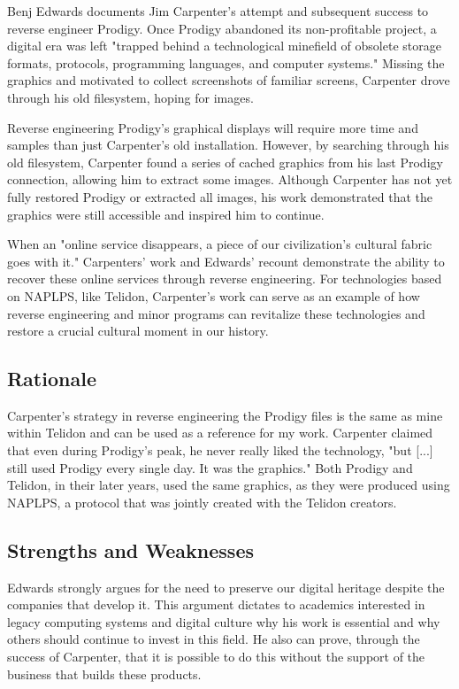 \documentclass[sigconf]{acmart}
\begin{document}
Benj Edwards documents Jim Carpenter's attempt and subsequent success to reverse engineer Prodigy. Once Prodigy abandoned its non-profitable project, a digital era was left "trapped behind a technological minefield of obsolete storage formats, protocols, programming languages, and computer systems." Missing the graphics and motivated to collect screenshots of familiar screens, Carpenter drove through his old filesystem, hoping for images.

Reverse engineering Prodigy's graphical displays will require more time and samples than just Carpenter's old installation. However, by searching through his old filesystem, Carpenter found a series of cached graphics from his last Prodigy connection, allowing him to extract some images. Although Carpenter has not yet fully restored Prodigy or extracted all images, his work demonstrated that the graphics were still accessible and inspired him to continue.

When an "online service disappears, a piece of our civilization's cultural fabric goes with it." Carpenters' work and Edwards' recount demonstrate the ability to recover these online services through reverse engineering. For technologies based on NAPLPS, like Telidon, Carpenter's work can serve as an example of how reverse engineering and minor programs can revitalize these technologies and restore a crucial cultural moment in our history. 

\subsection{Rationale}

Carpenter's strategy in reverse engineering the Prodigy files is the same as mine within Telidon and can be used as a reference for my work. Carpenter claimed that even during Prodigy's peak, he never really liked the technology, "but [...] still used Prodigy every single day. It was the graphics." Both Prodigy and Telidon, in their later years, used the same graphics, as they were produced using NAPLPS, a protocol that was jointly created with the Telidon creators.

\subsection{Strengths and Weaknesses}

Edwards strongly argues for the need to preserve our digital heritage despite the companies that develop it. This argument dictates to academics interested in legacy computing systems and digital culture why his work is essential and why others should continue to invest in this field. He also can prove, through the success of Carpenter, that it is possible to do this without the support of the business that builds these products.
 
\end{document}
